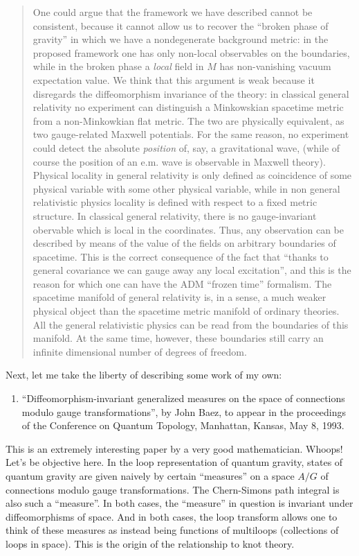 \documentclass{article}
\def\tightlist{}
\begin{document}
\begin{quote}
One could argue that the framework we have described cannot be
consistent, because it cannot allow us to recover the ``broken phase of
gravity'' in which we have a nondegenerate background metric: in the
proposed framework one has only non-local observables on the boundaries,
while in the broken phase a \emph{local} field in \(M\) has
non-vanishing vacuum expectation value. We think that this argument is
weak because it disregards the diffeomorphism invariance of the theory:
in classical general relativity no experiment can distinguish a
Minkowskian spacetime metric from a non-Minkowkian flat metric. The two
are physically equivalent, as two gauge-related Maxwell potentials. For
the same reason, no experiment could detect the absolute \emph{position}
of, say, a gravitational wave, (while of course the position of an e.m.
wave is observable in Maxwell theory). Physical locality in general
relativity is only defined as coincidence of some physical variable with
some other physical variable, while in non general relativistic physics
locality is defined with respect to a fixed metric structure. In
classical general relativity, there is no gauge-invariant obervable
which is local in the coordinates. Thus, any observation can be
described by means of the value of the fields on arbitrary boundaries of
spacetime. This is the correct consequence of the fact that ``thanks to
general covariance we can gauge away any local excitation'', and this is
the reason for which one can have the ADM ``frozen time'' formalism. The
spacetime manifold of general relativity is, in a sense, a much weaker
physical object than the spacetime metric manifold of ordinary theories.
All the general relativistic physics can be read from the boundaries of
this manifold. At the same time, however, these boundaries still carry
an infinite dimensional number of degrees of freedom.
\end{quote}

Next, let me take the liberty of describing some work of my own:

\begin{enumerate}
\def\labelenumi{\arabic{enumi})}
\setcounter{enumi}{2}
\tightlist
\item
  ``Diffeomorphism-invariant generalized measures on the space of
  connections modulo gauge transformations'', by John Baez, to appear in
  the proceedings of the Conference on Quantum Topology, Manhattan,
  Kansas, May 8, 1993.
\end{enumerate}

This is an extremely interesting paper by a very good mathematician.
Whoops! Let's be objective here. In the loop representation of quantum
gravity, states of quantum gravity are given naively by certain
``measures'' on a space \(A/G\) of connections modulo gauge
transformations. The Chern-Simons path integral is also such a
``measure''. In both cases, the ``measure'' in question is invariant
under diffeomorphisms of space. And in both cases, the loop transform
allows one to think of these measures as instead being functions of
multiloops (collections of loops in space). This is the origin of the
relationship to knot theory.
\end{document}
